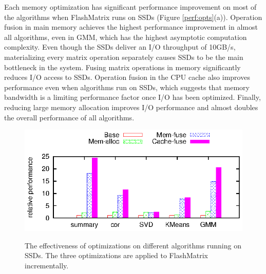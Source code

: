 Each memory optimization has significant performance improvement on most of
the algorithms when FlashMatrix runs on SSDs (Figure \ref{perf:opts}(a)).
Operation fusion in main memory achieves
the highest performance improvement in almost all algorithms, even in GMM,
which has the highest asymptotic computation complexity. Even though the SSDs
deliver an I/O throughput of 10GB/s, materializing every matrix operation
separately causes SSDs to be the main bottleneck in the system.
Fusing matrix operations in memory significantly reduces I/O access to SSDs.
Operation fusion in the CPU cache also improves performance even when algorithms run on SSDs,
which suggests that memory bandwidth is a limiting performance factor once 
I/O has been optimized.
Finally, reducing large memory allocation improves I/O performance and almost doubles
the overall performance of all algorithms.

\begin{figure}
	\begin{center}
		\footnotesize
		\includegraphics{FlashMatrix_figs/opts-EM.eps}
		\label{perf:em_opts}
    \vspace{-10pt}
		\caption{The effectiveness of optimizations on different algorithms
		running on SSDs. The three optimizations are applied to FlashMatrix
		incrementally.}
	\end{center}
  \vspace{-15pt}
\end{figure}

